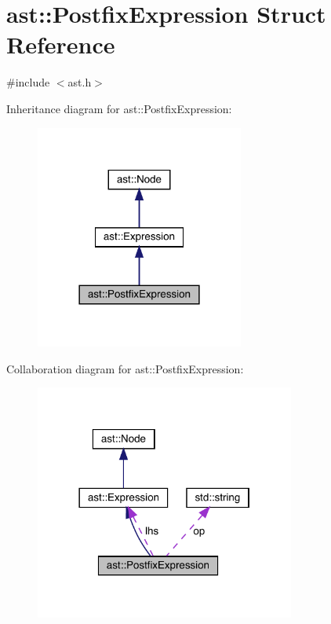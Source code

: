 \hypertarget{structast_1_1_postfix_expression}{}\section{ast\+:\+:Postfix\+Expression Struct Reference}
\label{structast_1_1_postfix_expression}


{\ttfamily \#include $<$ast.\+h$>$}



Inheritance diagram for ast\+:\+:Postfix\+Expression\+:
\nopagebreak
\begin{figure}[H]
\begin{center}
\leavevmode
\includegraphics[width=194pt]{structast_1_1_postfix_expression__inherit__graph}
\end{center}
\end{figure}


Collaboration diagram for ast\+:\+:Postfix\+Expression\+:
\nopagebreak
\begin{figure}[H]
\begin{center}
\leavevmode
\includegraphics[width=242pt]{structast_1_1_postfix_expression__coll__graph}
\end{center}
\end{figure}
